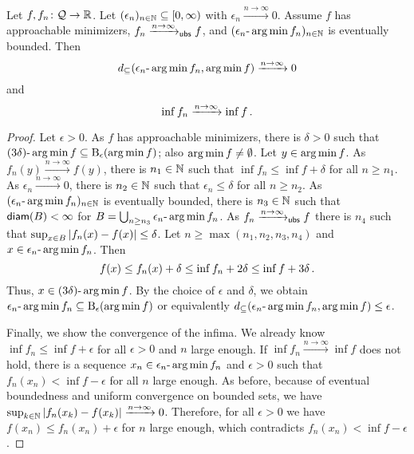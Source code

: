 %
\begin{theorem}\label{thm:alt:convOfMini}
	Let $f,f_n \colon \mathcal{Q}\to\mathbb{R}$. Let $(\epsilon_n)_{n\in\mathbb{N}}\subseteq [0,\infty)$ with $\epsilon_n \xrightarrow{n\to\infty}0$. 
	Assume $f$ has approachable minimizers, $f_n \xrightarrow{n\to\infty}_{\mathsf{ubs}} f$, and $(\epsilon_n\text{-}\operatorname*{arg\,min} f_n)_{n\in\mathbb{N}}$ is eventually bounded.
	Then
	\begin{equation*}
		d_\subseteq(\epsilon_n\text{-}\operatorname*{arg\,min} f_n, \operatorname*{arg\,min} f)\xrightarrow{n\to\infty}
		0
	\end{equation*}
	and
	\begin{equation*}
		\inf f_n \xrightarrow{n\to\infty} \inf f
		\, .
	\end{equation*}
\end{theorem}
%
\begin{proof}
		Let $\epsilon >0$. As $f$ has approachable minimizers, there is $\delta > 0$ such that $(3\delta)\text{-}\operatorname*{arg\,min} f \subseteq \operatorname{\mathrm{B}}_\epsilon(\operatorname*{arg\,min} f)$; also $\operatorname*{arg\,min} f \neq \emptyset$. Let $y\in\operatorname*{arg\,min} f$. As $f_n(y) \xrightarrow{n\to\infty} f(y)$, there is $n_1\in\mathbb{N}$ such that $\inf f_n \leq \inf f + \delta$ for all $n \geq n_1$.		
		As $\epsilon_n \xrightarrow{n\to\infty} 0$, there is $n_2\in\mathbb{N}$ such that $\epsilon_n \leq \delta$ for all $n \geq n_2$.
		As $(\epsilon_n\text{-}\operatorname*{arg\,min} f_n)_{n\in\mathbb{N}}$ is eventually bounded, there is $n_3\in\mathbb{N}$ such that $\operatorname{\mathsf{diam}}(B) < \infty$ for $B = \bigcup_{n\geq n_3} \epsilon_n\text{-}\operatorname*{arg\,min} f_n$.
		As $f_n \xrightarrow{n\to\infty}_{\mathsf{ubs}} f$ there is $n_4$ such that $\sup_{x\in B}\left| f_n(x) - f(x) \right| \leq \delta$.
		Let $n \geq \max(n_1, n_2, n_3, n_4)$ and $x \in \epsilon_n\text{-}\operatorname*{arg\,min} f_n$. Then
		\begin{equation*}
			f(x) \leq f_n(x) + \delta \leq \inf f_n + 2\delta \leq \inf f + 3\delta\, .
		\end{equation*}
		Thus, $x \in (3\delta)\text{-}\operatorname*{arg\,min} f$. By the choice of $\epsilon$ and $\delta$, we obtain $\epsilon_n\text{-}\operatorname*{arg\,min} f_n \subseteq \operatorname{\mathrm{B}}_\epsilon(\operatorname*{arg\,min} f)$ or equivalently $d_{\subseteq}(\epsilon_n\text{-}\operatorname*{arg\,min} f_n, \operatorname*{arg\,min} f) \leq \epsilon$.
		
		Finally, we show the convergence of the infima. We already know $\inf f_n \leq \inf f + \epsilon$ for all $\epsilon > 0$ and $n$ large enough.
		If $\inf f_n \xrightarrow{n\to\infty} \inf f$ does not hold, there is a sequence $x_n \in \epsilon_n\text{-}\operatorname*{arg\,min} f_n$ and $\epsilon > 0$ such that $f_n(x_n) < \inf f - \epsilon$ for all $n$ large enough. As before, because of eventual boundedness and uniform convergence on bounded sets, we have $\sup_{k\in\mathbb{N}}\left| f_n(x_k) - f(x_k) \right| \xrightarrow{n\to\infty} 0$. Therefore, for all $\epsilon >0$ we have $f(x_n) \leq f_n(x_n) + \epsilon$ for $n$ large enough, which contradicts $f_n(x_n) < \inf f - \epsilon$.
\end{proof}
